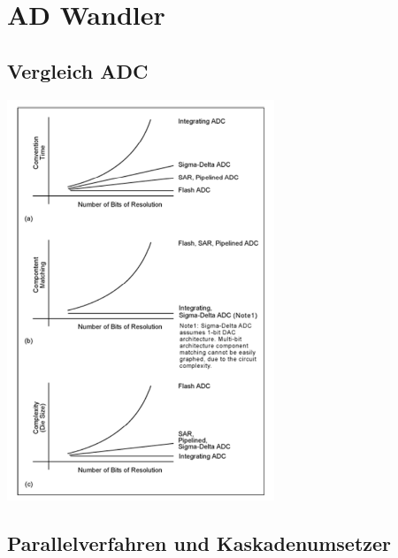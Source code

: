 \section{AD Wandler }

\subsection{Vergleich ADC}
\includegraphics[width=8cm, valign=t]{images/vergleich_ADC.png}

\newpage
\subsection{Parallelverfahren und Kaskadenumsetzer}

